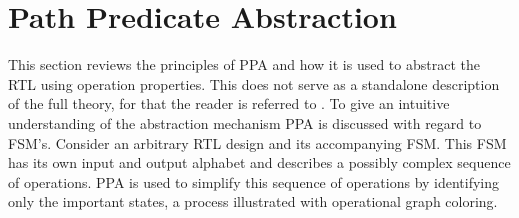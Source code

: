 \section{Path Predicate Abstraction}
\label{sec:ppa}

This section reviews the principles of PPA and how it is used to abstract the RTL using operation properties. This does not serve as a standalone description of the full theory, for that the reader is referred to \cite{2014-UrdahlStoffel.etal}. To give an intuitive understanding of the abstraction mechanism PPA is discussed with regard to FSM's. Consider an arbitrary RTL design and its accompanying FSM. This FSM has its own input and output alphabet and describes a possibly complex sequence of operations. PPA is used to simplify this sequence of operations by identifying only the important states, a process illustrated with operational graph coloring. \\ 


